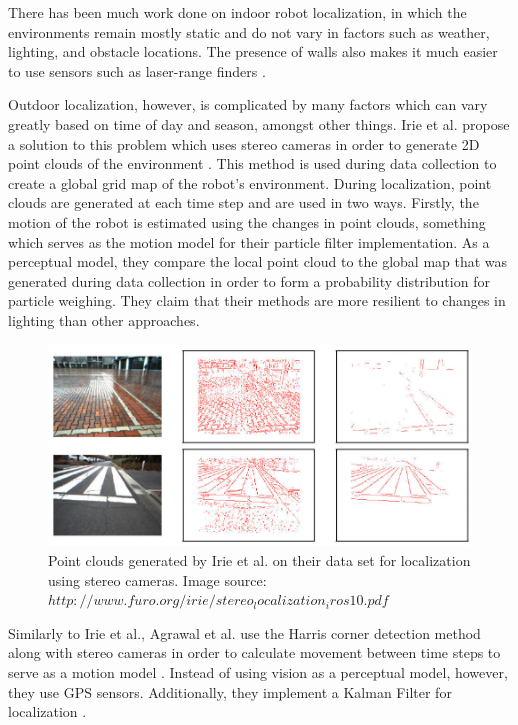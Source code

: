 \documentclass[letterpaper, 12 pt, conference]{ieeeconf}  %
\begin{document}
There has been much work done on indoor robot localization, in which the environments remain mostly static and do not vary in factors such as weather, lighting, and obstacle locations. The presence of walls also makes it much easier to use sensors such as laser-range finders \cite{laser_range}. 
\par
Outdoor localization, however, is complicated by many factors which can vary greatly based on time of day and season, amongst other things. Irie et al. propose a solution to this problem which uses stereo cameras in order to generate 2D point clouds of the environment \cite{irie2010mobile}. This method is used during data collection to create a global grid map of the robot's environment. During localization, point clouds are generated at each time step and are used in two ways. Firstly, the motion of the robot is estimated using the changes in point clouds, something which serves as the motion model for their particle filter implementation. As a perceptual model, they compare the local point cloud to the global map that was generated during data collection in order to form a probability distribution for particle weighing. They claim that their methods are more resilient to changes in lighting than other approaches.
\begin{figure}[h]
\centering
\includegraphics[scale=0.5]{point_clouds}
\caption{Point clouds generated by Irie et al. on their data set for localization using stereo cameras. Image source: $http://www.furo.org/irie/stereo_localization_iros10.pdf$}
\end{figure}

\par
Similarly to Irie et al., Agrawal et al. use the Harris corner detection method \cite{Harris} along with stereo cameras in order to calculate movement between time steps to serve as a motion model \cite{agrawal2006real}. Instead of using vision as a perceptual model, however, they use GPS sensors. Additionally, they implement a Kalman Filter for localization \cite{Kalman}.
\end{document}
